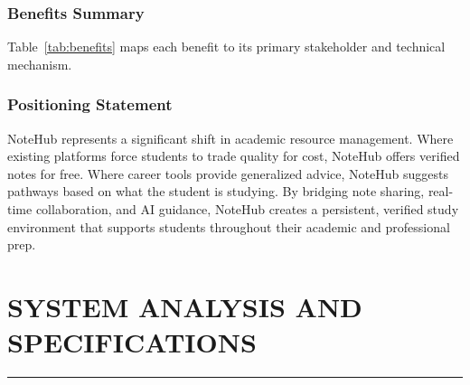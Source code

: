 \documentclass[12,Times new Roman,a4paper]{report}
\renewcommand{\arraystretch}{1.5} %
\begin{document}
\subsection{Benefits Summary}
Table~\ref{tab:benefits} maps each benefit to its primary stakeholder and technical mechanism.

\begin{table}[htbp]
\centering
\renewcommand{\arraystretch}{1.5}
\caption{Summary of NoteHub Benefits and Stakeholders}
\label{tab:benefits}
\end{table}

\subsection{Positioning Statement}
NoteHub represents a significant shift in academic resource management. Where existing platforms force students to trade quality for cost, NoteHub offers verified notes for free. Where career tools provide generalized advice, NoteHub suggests pathways based on what the student is studying. By bridging note sharing, real-time collaboration, and AI guidance, NoteHub creates a persistent, verified study environment that supports students throughout their academic and professional prep.
\chapter{SYSTEM ANALYSIS AND SPECIFICATIONS}
\rule{\textwidth}{1pt}
\end{document}
